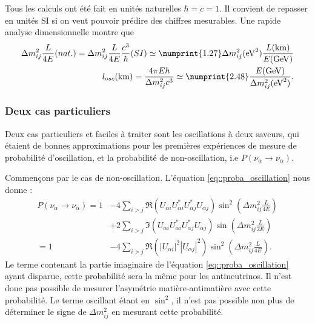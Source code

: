             Tous les calculs ont été fait en unités naturelles $\hbar = c = 1$. Il convient de repasser en unités SI si on veut pouvoir prédire des chiffres mesurables. Une rapide analyse dimensionnelle montre que 
            \begin{eqnarray}
                \Delta m_{ij}^2\frac{L}{4E}(nat.)
                = \Delta m_{ij}^2\frac{L}{4E}\frac{c^3}{\hbar}(SI)
                \simeq \numprint{1.27}\Delta m_{ij}^2(\si{\electronvolt\squared})\frac{L(\si{\kilo\meter})}{E(\si{\giga\electronvolt})} \\ 
                l_{osc}(\si{\kilo\meter}) = \frac{4\pi E\hbar}{\Delta m_{ij}^2c^3} \simeq \numprint{2.48}\frac{E(\si{\giga\electronvolt})}{\Delta m_{ij}^2(\si{\electronvolt\squared})}.
            \end{eqnarray}
            
        \subsubsection{Deux cas particuliers}
            Deux cas particuliers et faciles à traiter sont les oscillations à deux saveurs, qui étaient de bonnes approximations pour les premières expériences de mesure de probabilité d'oscillation, et la probabilité de non-oscillation, i.e $P(\nu_{\alpha}\to\nu_{\alpha})$.
            
            Commençons par le cas de non-oscillation. L'équation \eqref{eq::proba_oscillation} nous donne :
            \begin{equation}\label{eq::proba_non_oscillation}
                \begin{split}
                    P(\nu_{\alpha}\to\nu_{\alpha}) = 1 & - 4\sum_{i>j}\Re(U_{\alpha i}U_{\alpha i}^*U_{\alpha j}^*U_{\alpha j})\sin^2\left(\Delta m_{ij}^2\frac{L}{4E}\right) \\
                    & + 2\sum_{i>j}\Im(U_{\alpha i}U_{\alpha i}^*U_{\alpha j}^*U_{\alpha j})\sin\left(\Delta m_{ij}^2\frac{L}{2E}\right) \\
                    = 1 & -4\sum_{i>j}\Re(|U_{\alpha i}|^2|U_{\alpha j}|^2)\sin^2\left(\Delta m_{ij}^2\frac{L}{4E}\right).
                \end{split}
            \end{equation}
            Le terme contenant la partie imaginaire de l'équation \eqref{eq::proba_oscillation} ayant disparue, cette probabilité sera la même pour les antineutrinos. Il n'est donc pas possible de mesurer l'asymétrie matière-antimatière avec cette probabilité. Le terme oscillant étant en $\sin^2$, il n'est pas possible non plus de déterminer le signe de $\Delta m_{ij}^2$ en mesurant cette probabilité.
            
